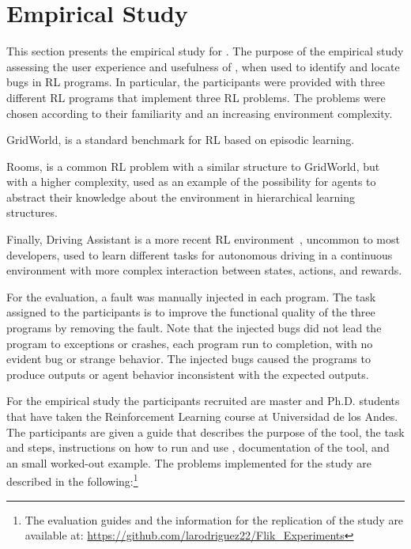 
\section{Empirical Study}
\label{sec:evaluation}

This section presents the empirical study for \flik. The purpose of the empirical study assessing the 
user experience and usefulness of \flik, when used to identify and locate bugs in  \ac{RL} programs. 
In particular, the participants were provided with three different \ac{RL} programs that implement three 
\ac{RL} problems. The problems were chosen according to their familiarity and an increasing 
environment complexity. 
\begin{enumerate*}[label=(\arabic*)]
\item GridWorld, is a standard benchmark for \ac{RL} based on episodic learning.
\item Rooms, is a common \ac{RL} problem with a similar structure to GridWorld, but with a higher 
complexity, used as an example of the possibility for agents to abstract their knowledge about the 
environment in hierarchical learning~\cite{pateria21} structures. 
\item Finally, Driving Assistant is a more recent \ac{RL} environment~\cite{cardozo18ml4pl,cardozo23}, 
uncommon to most developers, used to learn different tasks for autonomous driving in a continuous 
environment with more complex interaction between states, actions, and rewards. 
\end{enumerate*}

For the evaluation, a fault was manually injected in each program. The task assigned to the 
participants is to improve the functional quality of the three programs by removing the fault. Note that 
the injected bugs did not lead the program to exceptions or crashes, \ie each program run to 
completion, with no evident bug or strange behavior. The injected bugs caused the programs to 
produce outputs or agent behavior inconsistent with the expected outputs. 

For the empirical study the participants recruited are master and Ph.D. students that have taken the 
Reinforcement Learning course at Universidad de los Andes.  The participants are given a guide that 
describes the purpose of the tool, the task and steps, instructions on how to run and 
use \flik, documentation of the tool, and an small worked-out example. The problems implemented for 
the study are described in the following:\footnote{The evaluation guides and the information for the replication of the study are available at: \url{https://github.com/larodriguez22/Flik_Experiments}} 

